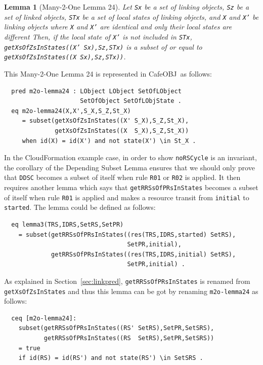 \documentclass[12pt]{report}
\newtheorem{lemma}{Lemma}
\newcommand{\stt}[1]{{\small{\tt {#1}}}}
\newcommand{\cafeobj}{{\sf CafeOBJ}~}
\begin{document}
\begin{lemma}[Many-2-One Lemma 24]
  Let {\tt Sx} be a set of linking objects, {\tt Sz} be a set of
  linked objects, {\tt STx} be a set of local states of linking
  objects, and {\tt X} and {\tt X'} be linking objects where {\tt X}
  and {\tt X'} are identical and only their local states are different
  Then, if the local state of {\tt X'} is not included in {\tt STx},
  \stt{getXsOfZsInStates((X' Sx),Sz,STx)} is a subset of or equal to
  \stt{getXsOfZsInStates((X Sx),Sz,STx))}.
\end{lemma}
This Many-2-One Lemma 24 is represented in \cafeobj as follows:
\begin{verbatim}
  pred m2o-lemma24 : LObject LObject SetOfLObject
                     SetOfObject SetOfLObjState .
  eq m2o-lemma24(X,X',S_X,S_Z,St_X)
     = subset(getXsOfZsInStates((X' S_X),S_Z,St_X),
              getXsOfZsInStates((X  S_X),S_Z,St_X))
     when id(X) = id(X') and not state(X') \in St_X .
\end{verbatim}
In the CloudFormation example case, in order to show {\tt noRSCycle}
is an invariant, the corollary of the Depending Subset Lemma ensures
that we should only prove that {\tt DDSC} becomes a subset of itself
when rule {\tt R01} or {\tt R02} is applied. It then requires another
lemma which says that {\tt getRRSsOfPRsInStates} becomes a subset of
itself when rule {\tt R01} is applied and makes a resource transit
from {\tt initial} to {\tt started}.  The lemma could be defined as
follows:
\begin{verbatim}
  eq lemma3(TRS,IDRS,SetRS,SetPR)
    = subset(getRRSsOfPRsInStates((res(TRS,IDRS,started) SetRS),
                                  SetPR,initial), 
             getRRSsOfPRsInStates((res(TRS,IDRS,initial) SetRS),
                                  SetPR,initial) .
\end{verbatim}
As explained in Section~\ref{sec:linkpred}, {\tt getRRSsOfPRsInStates}
is renamed from {\tt getXsOfZsInStates} and thus this lemma can be got
by renaming {\tt m2o-lemma24} as follows:
\begin{verbatim}
  ceq [m2o-lemma24]:
    subset(getRRSsOfPRsInStates((RS' SetRS),SetPR,SetSRS),
           getRRSsOfPRsInStates((RS  SetRS),SetPR,SetSRS))
    = true
    if id(RS) = id(RS') and not state(RS') \in SetSRS .
\end{verbatim}
\end{document}

